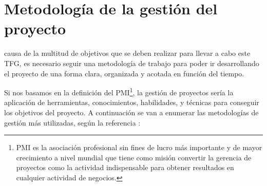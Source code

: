 \chapter{Metodología de la gestión del proyecto}
\label{chap:metodología}

 causa de la multitud de objetivos que se deben realizar para llevar a cabo este \ac{TFG}, es necesario seguir una metodología de trabajo para poder ir desarrollando el proyecto de una forma clara, organizada y acotada en función del tiempo.

Si nos basamos en la definición del \ac{PMI}\footnote{PMI es la asociación profesional sin fines de lucro más importante y de mayor crecimiento a nivel mundial que tiene como misión convertir la gerencia de proyectos como la actividad indispensable para obtener resultados en cualquier actividad de negocios.}, la gestión de proyectos sería la aplicación de herramientas, conocimientos, habilidades, y técnicas para conseguir los objetivos del proyecto. A continuación se van a enumerar las metodologías de gestión más utilizadas, según la referencia \cite{MetodologiasGestion}:  

